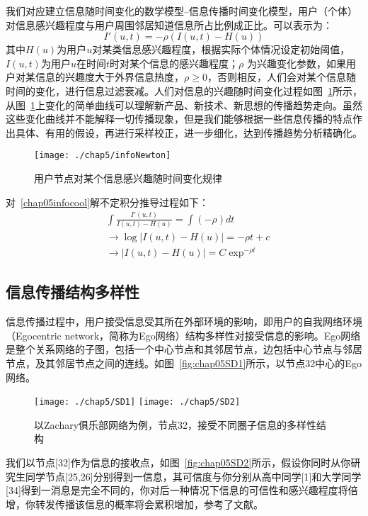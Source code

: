 我们对应建立信息随时间变化的数学模型--信息传播时间变化模型，用户（个体）对信息感兴趣程度与用户周围邻居知道信息所占比例成正比。可以表示为：
\begin{equation} 
\label{chap05infocool}
I'(u,t) = -\rho (I(u,t)-H(u))
\end{equation}
其中$H(u)$为用户$u$对某类信息感兴趣程度，根据实际个体情况设定初始阈值，$I(u,t)$为用户$u$在时间$t$时对某个信息的感兴趣程度；$\rho $ 为兴趣变化参数，如果用户对某信息的兴趣度大于外界信息热度，$\rho \geq 0$，否则相反，人们会对某个信息随时间的变化，进行信息过滤衰减。人们对信息的兴趣随时间变化过程如图~\ref{fig:chap05infoNewton}所示，从图~\ref{fig:chap05infoNewton}上变化的简单曲线可以理解新产品、新技术、新思想的传播趋势走向。虽然这些变化曲线并不能解释一切传播现象，但是我们能够根据一些信息传播的特点作出具体、有用的假设，再进行采样校正，进一步细化，达到传播趋势分析精确化。
\begin{figure}[H] %
	\centering
	\texttt{[image: ./chap5/infoNewton]}
	\caption{用户节点对某个信息感兴趣随时间变化规律}
	\label{fig:chap05infoNewton}
\end{figure}

对~\ref{chap05infocool}解不定积分推导过程如下：
\begin{equation} 
\label{chap05infocooldirivation}
\begin{split}
&\int \frac{I'(u,t)}{I(u,t)-H(u)} = \int (-\rho)dt \\
&\rightarrow \log |I(u,t)-H(u)| = -\rho t + c \\
&\rightarrow |I(u,t)-H(u)| = C \exp ^{-\rho t }
\end{split}
\end{equation}

\subsection{信息传播结构多样性}
信息传播过程中，用户接受信息受其所在外部环境的影响，即用户的自我网络环境（Egocentric network，简称为Ego网络）\cite{marsden2002egocentric,fisher2005using,weng2014topic}结构多样性对接受信息的影响。Ego网络是整个关系网络的子图，包括一个中心节点和其邻居节点，边包括中心节点与邻居节点，及其邻居节点之间的连线。如图~\ref{fig:chap05SD1}所示，以节点32中心的Ego网络。

\begin{figure}[H]
	\centering%
	{\texttt{[image: ./chap5/SD1]}}
	{\texttt{[image: ./chap5/SD2]}}
	
	\caption{以Zachary俱乐部网络为例，节点32，接受不同圈子信息的多样性结构}
	\label{fig:chap05egonetwork}
\end{figure}
我们以节点[32]作为信息的接收点，如图~\ref{fig:chap05SD2}所示，假设你同时从你研究生同学节点[25,26]分别得到一信息，其可信度与你分别从高中同学[1]和大学同学[34]得到一消息是完全不同的，你对后一种情况下信息的可信性和感兴趣程度将倍增，你转发传播该信息的概率将会累积增加，参考了文献\cite{ugander2012structural}。

